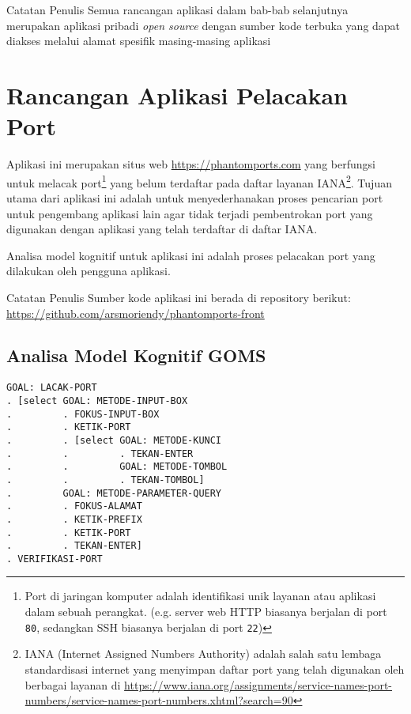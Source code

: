 \maketitle

\begin{info}{Catatan Penulis}
  Semua rancangan aplikasi dalam bab-bab selanjutnya merupakan
  aplikasi pribadi \textit{open source} dengan sumber kode terbuka
  yang dapat diakses melalui alamat spesifik masing-masing aplikasi
\end{info}

\section{Rancangan Aplikasi Pelacakan Port}

Aplikasi ini merupakan situs web \url{https://phantomports.com} yang
berfungsi untuk melacak port\footnote{
  Port di jaringan komputer adalah identifikasi unik layanan atau
  aplikasi dalam sebuah perangkat. (e.g. server web HTTP biasanya
    berjalan di port \texttt{80}, sedangkan SSH biasanya berjalan di
  port \texttt{22})
}
yang belum terdaftar pada daftar layanan IANA\footnote{
  IANA (Internet Assigned Numbers Authority) adalah salah satu
  lembaga standardisasi internet yang  menyimpan daftar port yang
  telah digunakan oleh berbagai layanan di
  \url{https://www.iana.org/assignments/service-names-port-numbers/service-names-port-numbers.xhtml?search=90}
}. Tujuan utama dari aplikasi ini adalah untuk menyederhanakan proses
pencarian port untuk pengembang aplikasi lain agar tidak terjadi
pembentrokan port yang digunakan dengan aplikasi yang telah terdaftar
di daftar IANA.

Analisa model kognitif untuk aplikasi ini adalah proses pelacakan
port yang dilakukan oleh pengguna aplikasi.

\begin{info}{Catatan Penulis}
  Sumber kode aplikasi ini berada di repository berikut:
  \url{https://github.com/arsmoriendy/phantomports-front}
\end{info}

\clearpage
\subsection{Analisa Model Kognitif GOMS}

\begin{verbatim}
GOAL: LACAK-PORT
. [select GOAL: METODE-INPUT-BOX
.         . FOKUS-INPUT-BOX
.         . KETIK-PORT
.         . [select GOAL: METODE-KUNCI
.         .         . TEKAN-ENTER
.         .         GOAL: METODE-TOMBOL
.         .         . TEKAN-TOMBOL]
.         GOAL: METODE-PARAMETER-QUERY
.         . FOKUS-ALAMAT
.         . KETIK-PREFIX
.         . KETIK-PORT
.         . TEKAN-ENTER]
. VERIFIKASI-PORT
\end{verbatim}

